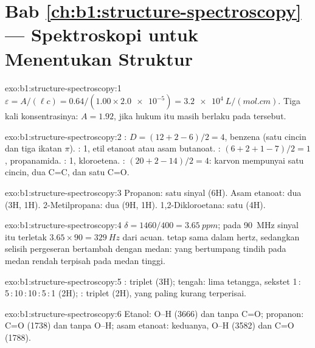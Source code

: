 \section*{Bab \ref{ch:b1:structure-spectroscopy} --- Spektroskopi untuk Menentukan Struktur}

\begin{solution}{exo:b1:structure-spectroscopy:1}
$\varepsilon = A/(\ell c) = 0.64/(1.00 \times \num{2.0e-5}) =
\qty{3.2e4}{L/(mol.cm)}$. Tiga kali konsentrasinya: $A = 1.92$, jika
hukum itu masih berlaku pada  tersebut.
\end{solution}

\begin{solution}{exo:b1:structure-spectroscopy:2}
: $D = (12 + 2 - 6)/2 = 4$, benzena (satu cincin dan tiga ikatan
$\pi$). : 1, etil etanoat atau asam butanoat. :
$(6 + 2 + 1
- 7)/2 = 1$, propanamida. : 1, kloroetena. :
$(20 + 2 - 14)/2 = 4$: karvon mempunyai satu cincin, dua C=C, dan satu
C=O.
\end{solution}

\begin{solution}{exo:b1:structure-spectroscopy:3}
Propanon: satu sinyal (6H). Asam etanoat: dua (3H, 1H). 2-Metilpropana:
dua (9H, 1H). 1,2-Dikloroetana: satu (4H).
\end{solution}

\begin{solution}{exo:b1:structure-spectroscopy:4}
$\delta = 1460/400 = \qty{3.65}{ppm}$; pada \qty{90}{MHz} sinyal itu
terletak $3.65 \times 90 = \qty{329}{Hz}$ dari acuan. 
tetap sama dalam hertz, sedangkan selisih pergeseran bertambah dengan
medan:  yang bertumpang tindih pada medan rendah
terpisah pada medan tinggi.
\end{solution}

\begin{solution}{exo:b1:structure-spectroscopy:5}
: triplet (3H);  tengah: lima tetangga, sekstet
1\,:\,5\,:\,10\,:\,10\,:\,5\,:\,1 (2H); : triplet (2H), yang
paling kurang terperisai.
\end{solution}

\begin{solution}{exo:b1:structure-spectroscopy:6}
Etanol: O--H (3666) dan tanpa C=O; propanon: C=O (1738) dan tanpa O--H;
asam etanoat: keduanya, O--H (3582) dan C=O (1788).
\end{solution}

